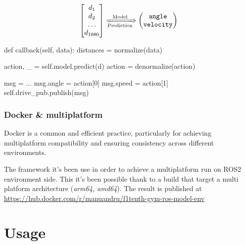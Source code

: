 \documentclass[conference]{IEEEtran}
\begin{document}
\begin{equation*}
\begin{bmatrix}
    d_1\\
    d_2\\
    \dots\\
    d_{1080}
\end{bmatrix}
\xRightarrow[\text{Prediction}]{\text{Model}}
\begin{pmatrix}
    \texttt{angle}\\
    \texttt{velocity}
\end{pmatrix}
\end{equation*}

\medskip

\begin{python}
def callback(self, data):
  distances = normalize(data)

  action, _ = self.model.predict(d)
  action = denormalize(action)

  msg = ...
  msg.angle = action[0]
  msg.speed = action[1]
  self.drive_pub.publish(msg)
\end{python}

%
%
%
\subsubsection*{Docker \& multiplatform}

Docker\cite{docker} is a common and efficient practice, particularly for achieving multiplatform compatibility and ensuring consistency across different environments.

The framework it's been use in order to achieve a multiplatform run on ROS2 environment side.
%
This it's been possible thank to a build that target a multi platform architecture (\emph{arm64, amd64}).
%
The result is published at \url{https://hub.docker.com/r/manuandru/f1tenth-gym-ros-model-env}

%
%
%
\section{Usage}


\end{document}

